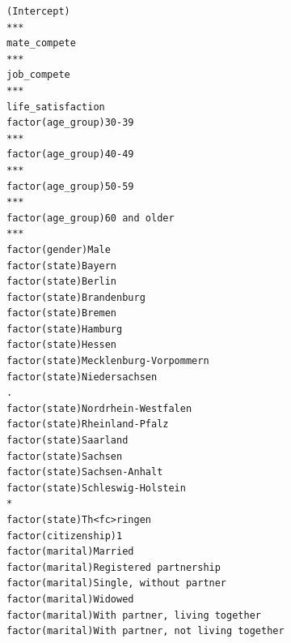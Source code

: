 \documentclass[
]{article}
\begin{document}
\begin{table}
\begin{minipage}[t]{\linewidth}
{\begin{verbatim}
(Intercept)                                                                       ***
mate_compete                                                                      ***
job_compete                                                                       ***
life_satisfaction                                                                    
factor(age_group)30-39                                                            ***
factor(age_group)40-49                                                            ***
factor(age_group)50-59                                                            ***
factor(age_group)60 and older                                                     ***
factor(gender)Male                                                                   
factor(state)Bayern                                                                  
factor(state)Berlin                                                                  
factor(state)Brandenburg                                                             
factor(state)Bremen                                                                  
factor(state)Hamburg                                                                 
factor(state)Hessen                                                                  
factor(state)Mecklenburg-Vorpommern                                                  
factor(state)Niedersachsen                                                        .  
factor(state)Nordrhein-Westfalen                                                     
factor(state)Rheinland-Pfalz                                                         
factor(state)Saarland                                                                
factor(state)Sachsen                                                                 
factor(state)Sachsen-Anhalt                                                          
factor(state)Schleswig-Holstein                                                   *  
factor(state)Th<fc>ringen                                                            
factor(citizenship)1                                                                 
factor(marital)Married                                                               
factor(marital)Registered partnership                                                
factor(marital)Single, without partner                                               
factor(marital)Widowed                                                               
factor(marital)With partner, living together                                         
factor(marital)With partner, not living together                                     

\end{verbatim}}
\end{minipage}
\end{table}
\end{document}
